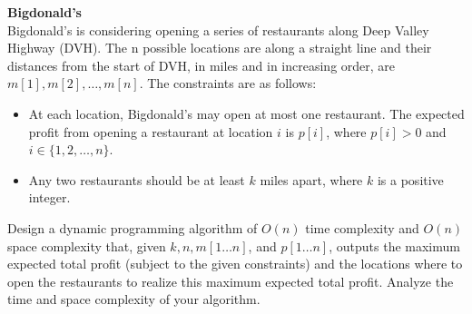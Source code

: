 \textbf{Bigdonald's} \\
Bigdonald's is considering opening a series of restaurants along Deep Valley Highway (DVH). The n
possible locations are along a straight line and their distances from the start of DVH, in miles and in
increasing order, are $m[1], m[2], \ldots, m[n]$. The constraints are as follows:
\begin{itemize}
    \item At each location, Bigdonald’s may open at most one restaurant. The expected profit from opening
    a restaurant at location $i$ is $p[i]$, where $p[i] > 0$ and $i \in \{1, 2, \ldots, n\}$.
    \item Any two restaurants should be at least $k$ miles apart, where $k$ is a positive integer.
\end{itemize}
Design a dynamic programming algorithm of $O(n)$ time complexity and $O(n)$ space complexity that,
given $k, n, m[1 \ldots n]$, and $p[1 \ldots n]$, outputs the maximum expected total profit (subject to the given
constraints) and the locations where to open the restaurants to realize this maximum expected total
profit. Analyze the time and space complexity of your algorithm.

